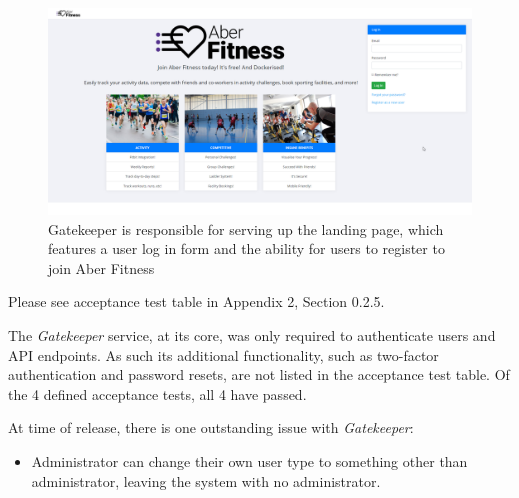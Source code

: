 \begin{figure}[H]
    \centering
    \includegraphics[width=\textwidth]{Images/service_landing_page.png}
    \caption{Gatekeeper is responsible for serving up the landing page, which features a user log in form and the ability for users to register to join Aber Fitness}
\end{figure}

Please see acceptance test table in Appendix 2, Section 0.2.5.

The \textit{Gatekeeper} service, at its core, was only required to authenticate users and API endpoints. As such its additional functionality, such as two-factor authentication and password resets, are not listed in the acceptance test table. Of the 4 defined acceptance tests, all 4 have passed.

At time of release, there is one outstanding issue with \textit{Gatekeeper}: 

\begin{itemize}
	\item Administrator can change their own user type to something other than administrator, leaving the system with no administrator.
\end{itemize}